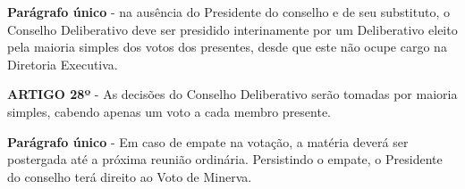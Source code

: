 \textbf{Parágrafo único} - na ausência do Presidente do conselho e de seu 
substituto, o Conselho Deliberativo deve ser presidido interinamente por um 
Deliberativo eleito pela maioria simples dos votos dos presentes, 
desde que este não ocupe cargo na Diretoria Executiva.

\bigskip

\textbf{ARTIGO 28º} - As decisões do Conselho Deliberativo serão tomadas por 
maioria simples, cabendo apenas um voto a cada membro presente. 

\bigskip

\textbf{Parágrafo único} - Em caso de empate na votação, a matéria deverá 
ser postergada até a próxima reunião ordinária. 
Persistindo o empate, o Presidente do conselho terá direito ao Voto de Minerva.
